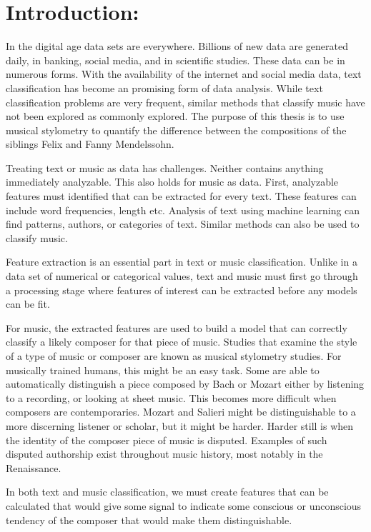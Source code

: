 \documentclass[12pt,twoside]{reedthesis}
\theoremstyle{definition}
\theoremstyle{definition}
\theoremstyle{definition}
\theoremstyle{remark}
\begin{document}
\section{Introduction:}\label{introduction}

In the digital age data sets are everywhere. Billions of new data are
generated daily, in banking, social media, and in scientific studies.
These data can be in numerous forms. With the availability of the
internet and social media data, text classification has become an
promising form of data analysis. While text classification problems are
very frequent, similar methods that classify music have not been
explored as commonly explored. The purpose of this thesis is to use
musical stylometry to quantify the difference between the compositions
of the siblings Felix and Fanny Mendelssohn.

Treating text or music as data has challenges. Neither contains anything
immediately analyzable. This also holds for music as data. First,
analyzable features must identified that can be extracted for every
text. These features can include word frequencies, length etc. Analysis
of text using machine learning can find patterns, authors, or categories
of text. Similar methods can also be used to classify music.

Feature extraction is an essential part in text or music classification.
Unlike in a data set of numerical or categorical values, text and music
must first go through a processing stage where features of interest can
be extracted before any models can be fit.

For music, the extracted features are used to build a model that can
correctly classify a likely composer for that piece of music. Studies
that examine the style of a type of music or composer are known as
musical stylometry studies. For musically trained humans, this might be
an easy task. Some are able to automatically distinguish a piece
composed by Bach or Mozart either by listening to a recording, or
looking at sheet music. This becomes more difficult when composers are
contemporaries. Mozart and Salieri might be distinguishable to a more
discerning listener or scholar, but it might be harder. Harder still is
when the identity of the composer piece of music is disputed. Examples
of such disputed authorship exist throughout music history, most notably
in the Renaissance.

In both text and music classification, we must create features that can
be calculated that would give some signal to indicate some conscious or
unconscious tendency of the composer that would make them
distinguishable.
\end{document}
